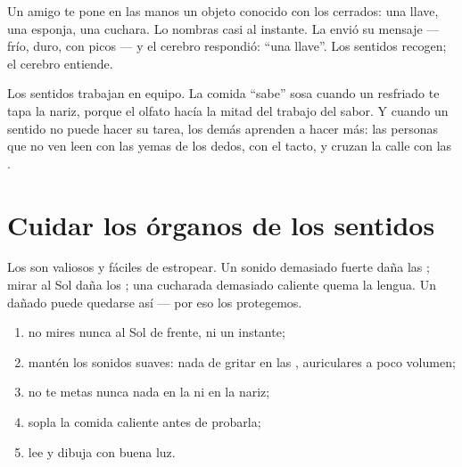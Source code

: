 \begin{example}\label{ex:g1:the-five-senses:dark}
Un amigo te pone en las manos un objeto conocido con los 
cerrados: una llave, una esponja, una cuchara. Lo nombras casi al
instante. La  envió su mensaje --- frío, duro, con picos --- y el
cerebro respondió: ``una llave''. Los sentidos recogen; el cerebro
entiende.
\end{example}

\begin{remark}\label{rem:g1:the-five-senses:together}
Los sentidos trabajan en equipo. La comida ``sabe'' sosa cuando un
resfriado te tapa la nariz, porque el olfato hacía la mitad del
trabajo del sabor. Y cuando un sentido no puede hacer su tarea, los
demás aprenden a hacer más: las personas que no ven leen con las
yemas de los dedos, con el tacto, y cruzan la calle con las .
\end{remark}

\section{Cuidar los órganos de los sentidos}

\begin{proposition}\label{prop:g1:the-five-senses:fragile}
Los  son valiosos y fáciles de estropear. Un
sonido demasiado fuerte daña las ; mirar al Sol daña los ;
una cucharada demasiado caliente quema la lengua. Un  dañado puede quedarse así --- por eso los protegemos.
\end{proposition}
\admitted

\begin{method}\label{met:g1:the-five-senses:protect}
\begin{enumerate}
  \item no mires nunca al Sol de frente, ni un instante;
  \item mantén los sonidos suaves: nada de gritar en las ,
        auriculares a poco volumen;
  \item no te metas nunca nada en la  ni en la nariz;
  \item sopla la comida caliente antes de probarla;
  \item lee y dibuja con buena luz.
\end{enumerate}
\end{method}

